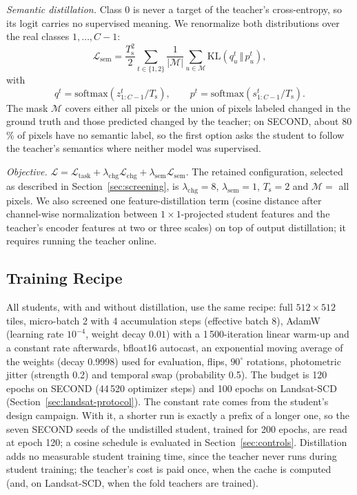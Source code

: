 \documentclass[journal]{IEEEtran}
\begin{document}
\emph{Semantic distillation.} Class 0 is never a target of the teacher's cross-entropy, so its
logit carries no supervised meaning. We renormalize both distributions over the real classes
$1,\dots,C-1$:
\begin{equation}
\mathcal{L}_{\mathrm{sem}} = \frac{T_{\mathrm{s}}^{2}}{2}\sum_{t\in\{1,2\}}
\frac{1}{|\mathcal{M}|}\sum_{u\in\mathcal{M}}
\mathrm{KL}\!\left(q^{t}_{u}\,\Vert\,p^{t}_{u}\right),
\end{equation}
with
\[
q^{t}=\mathrm{softmax}(z^{t}_{1:C-1}/T_{\mathrm{s}}),\qquad
p^{t}=\mathrm{softmax}(s^{t}_{1:C-1}/T_{\mathrm{s}}).
\]
The mask $\mathcal{M}$ covers either all pixels or the union of pixels labeled changed in the
ground truth and those predicted changed by the teacher; on SECOND,
about 80\,\% of pixels have no semantic label, so the first option asks the student to follow
the teacher's semantics where neither model was supervised.

\emph{Objective.} $\mathcal{L}=\mathcal{L}_{\mathrm{task}}+\lambda_{\mathrm{chg}}
\mathcal{L}_{\mathrm{chg}}+\lambda_{\mathrm{sem}}\mathcal{L}_{\mathrm{sem}}$. The retained
configuration, selected as described in Section~\ref{sec:screening}, is
$\lambda_{\mathrm{chg}}=8$, $\lambda_{\mathrm{sem}}=1$, $T_{\mathrm{s}}=2$ and
$\mathcal{M}=$ all pixels. We also screened one feature-distillation term (cosine distance after channel-wise
normalization between $1\times1$-projected student features and the teacher's encoder features at
two or three scales) on top of output distillation; it requires running the teacher online.

\subsection{Training Recipe}
\label{sec:recipe}
All students, with and without distillation, use the same recipe: full $512\times512$ tiles,
micro-batch 2 with 4 accumulation steps (effective batch 8), AdamW (learning rate
$10^{-4}$, weight decay $0.01$) with a 1\,500-iteration linear warm-up and a constant rate
afterwards, bfloat16 autocast, an exponential moving average of the weights (decay 0.9998)
used for evaluation, flips, $90^\circ$ rotations, photometric jitter (strength 0.2) and
temporal swap (probability 0.5). The budget is 120 epochs on SECOND (44\,520 optimizer steps)
and 100 epochs on Landsat-SCD (Section~\ref{sec:landsat-protocol}). The constant rate comes from the student's design campaign. With it, a shorter run is exactly a
prefix of a longer one, so the seven SECOND seeds of the undistilled student, trained for 200
epochs, are read at epoch 120; a cosine schedule is evaluated in Section~\ref{sec:controls}. Distillation adds no measurable student training time, since the teacher never runs during
student training; the teacher's cost is paid once, when the cache is computed (and, on
Landsat-SCD, when the fold teachers are trained).
\end{document}
